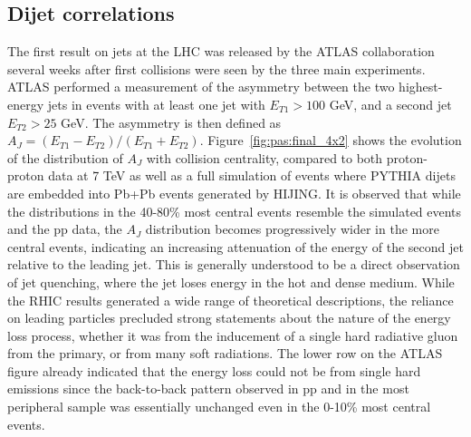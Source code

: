 \subsection{Dijet correlations}

The first result on jets at the LHC was released by the ATLAS collaboration 
several weeks after first collisions were seen by the three main experiments.  
ATLAS performed a measurement of
the asymmetry between the two highest-energy jets in events with at least one jet
with $E_{T1} > 100$ GeV, and a second jet $E_{T2} > 25$ GeV.  The asymmetry is
then defined as $A_J = (E_{T1} - E_{T2})/(E_{T1} + E_{T2})$.
Figure~\ref{fig:pas:final_4x2} shows the evolution of the distribution of
$A_J$ with collision centrality, compared to both proton-proton data at 7 TeV
as well as a full simulation of events where PYTHIA dijets are embedded into
Pb+Pb events generated by HIJING.
It is observed that while the distributions in the 40-80\% most central events
resemble the simulated events and the pp data, the $A_J$ distribution becomes
progressively wider in the more central events, indicating an increasing attenuation
of the energy of the second jet relative to the leading jet.  This is generally
understood to be a direct observation of jet quenching, where the jet loses energy
in the hot and dense medium.
While the RHIC results generated a wide range of theoretical descriptions, the reliance
on leading particles precluded strong statements about the nature of the energy
loss process, whether it was from the inducement of a single hard radiative gluon
from the primary, or from many soft radiations.
The lower row on the ATLAS figure already indicated that the energy loss could not be
from single hard emissions since the back-to-back pattern observed in pp and in
the most peripheral sample was essentially unchanged even in the 0-10\% most
central events.

